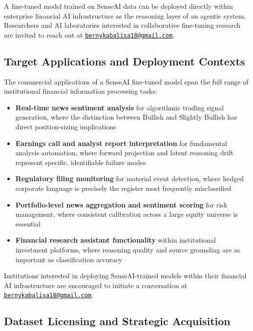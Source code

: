 \documentclass[11pt,a4paper]{article}
\begin{document}
A fine-tuned model trained on SenseAI data can be deployed directly within
enterprise financial AI infrastructure as the reasoning layer of an agentic system.
Researchers and AI laboratories interested in collaborative fine-tuning research are
invited to reach out at
\href{mailto:bernykabalisa18@gmail.com}{\texttt{bernykabalisa18@gmail.com}}.

\subsection{Target Applications and Deployment Contexts}

The commercial applications of a SenseAI fine-tuned model span the full range of
institutional financial information processing tasks:

\begin{itemize}[leftmargin=1.8em, itemsep=4pt]
  \item \textbf{Real-time news sentiment analysis} for algorithmic trading signal
        generation, where the distinction between Bullish and Slightly Bullish has
        direct position-sizing implications
  \item \textbf{Earnings call and analyst report interpretation} for fundamental
        analysis automation, where forward projection and latent reasoning drift
        represent specific, identifiable failure modes
  \item \textbf{Regulatory filing monitoring} for material event detection, where
        hedged corporate language is precisely the register most frequently
        misclassified
  \item \textbf{Portfolio-level news aggregation and sentiment scoring} for risk
        management, where consistent calibration across a large equity universe
        is essential
  \item \textbf{Financial research assistant functionality} within institutional
        investment platforms, where reasoning quality and source grounding are
        as important as classification accuracy
\end{itemize}

Institutions interested in deploying SenseAI-trained models within their financial AI
infrastructure are encouraged to initiate a conversation at
\href{mailto:bernykabalisa18@gmail.com}{\texttt{bernykabalisa18@gmail.com}}.

\subsection{Dataset Licensing and Strategic Acquisition}
\end{document}
